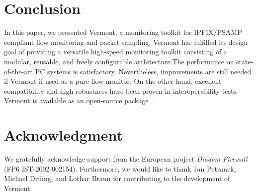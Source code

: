 \section{Conclusion}
\label{sec:conclusion}

In this paper, we presented Vermont, a monitoring toolkit for IPFIX/PSAMP compliant flow monitoring and packet sampling. Vermont has fulfilled its design goal of providing a versatile high-speed monitoring toolkit consisting of a modular, reusable, and freely configurable architecture.The performance on state-of-the-art PC systems is satisfactory. Nevertheless, improvements are still needed if Vermont if used as a pure flow monitor. On the other hand, excellent compatibility and high robustness have been proven in interoperability tests. Vermont is available as an open-source package~\cite{vermont-site}.


\section*{Acknowledgment}
We gratefully acknowledge support from the European project \emph{Diadem Firewall} (FP6 IST-2002-002154). 
Furthermore, we would like to thank Jan Petranek, Michael Dr\"uing, and Lothar Braun for contributing to the development of Vermont.
